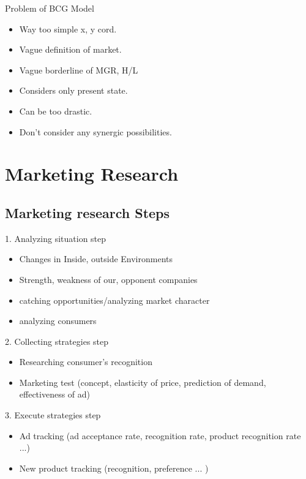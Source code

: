 \documentclass[12pt]{article}
\begin{document}
Problem of BCG Model

\begin{itemize}
  \item Way too simple x, y cord.
  \item Vague definition of market.
  \item Vague borderline of MGR, H/L
  \item Considers only present state.
  \item Can be too drastic.
  \item Don't consider any synergic possibilities.
\end{itemize}

%
%



\section{Marketing Research}

\subsection{Marketing research Steps}

1. Analyzing situation step
\begin{itemize}
	\item Changes in Inside, outside Environments
	\item Strength, weakness of our, opponent companies
	\item catching opportunities/analyzing market character
	\item analyzing consumers
\end{itemize}

2. Collecting strategies step
\begin{itemize}
	\item Researching consumer's recognition
	\item Marketing test (concept, elasticity of price, prediction of demand, effectiveness of ad)
\end{itemize}

3. Execute strategies step
\begin{itemize}
	\item Ad tracking (ad acceptance rate, recognition rate, product recognition rate ...)
	\item New product tracking (recognition, preference ... )
\end{itemize}
\end{document}
